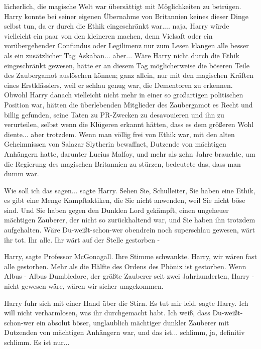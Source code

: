 lächerlich, die magische Welt war übersättigt mit Möglichkeiten zu betrügen.
Harry konnte bei seiner eigenen Übernahme von Britannien keines dieser Dinge
selbst tun, da er durch die Ethik eingeschränkt war.... naja, Harry würde
vielleicht ein paar von den kleineren machen, denn Vielsaft oder ein
vorübergehender Confundus oder Legilimenz nur zum Lesen klangen alle besser als
ein zusätzlicher Tag Askaban... aber... Wäre Harry nicht durch die Ethik
eingeschränkt gewesen, hätte er an diesem Tag möglicherweise die böseren Teile
des Zaubergamot auslöschen können; ganz allein, nur mit den magischen Kräften
eines Erstklässlers, weil er schlau genug war, die Dementoren zu erkennen.
Obwohl Harry danach vielleicht nicht mehr in einer so großartigen politischen
Position war, hätten die überlebenden Mitglieder des Zaubergamot es Recht und
billig gefunden, seine Taten zu PR-Zwecken zu desavouieren und ihn zu
verurteilen, selbst wenn die Klügeren erkannt hätten, dass es dem größeren Wohl
diente... aber trotzdem. Wenn man völlig frei von Ethik war, mit den alten
Geheimnissen von Salazar Slytherin bewaffnet, Dutzende von mächtigen Anhängern
hatte, darunter Lucius Malfoy, und mehr als zehn Jahre brauchte, um die
Regierung des magischen Britannien zu stürzen, bedeutete das, dass man dumm war.

\glqq{}Wie soll ich das sagen...\grqq{} sagte Harry. \glqq{}Sehen Sie,
Schulleiter, Sie haben eine Ethik, es gibt eine Menge Kampftaktiken, die Sie
nicht anwenden, weil Sie nicht böse sind. Und Sie haben gegen den Dunklen Lord
gekämpft, einen ungeheuer mächtigen Zauberer, der nicht so zurückhaltend war,
und Sie haben ihn trotzdem aufgehalten. Wäre Du-weißt-schon-wer obendrein noch
superschlau gewesen, wärt ihr tot. Ihr alle. Ihr wärt auf der Stelle gestorben
-\grqq{}

\glqq{}Harry\grqq{}, sagte Professor McGonagall. Ihre Stimme schwankte. \glqq{}
Harry, wir wären fast alle gestorben. Mehr als die Hälfte des Ordens des Phönix
ist gestorben. Wenn Albus - Albus Dumbledore, der größte Zauberer seit zwei
Jahrhunderten, Harry - nicht gewesen wäre, wären wir sicher umgekommen.\grqq{}

Harry fuhr sich mit einer Hand über die Stirn. \glqq{}Es tut mir leid\grqq{},
sagte Harry. \glqq{}Ich will nicht verharmlosen, was ihr durchgemacht habt. Ich
weiß, dass Du-weißt-schon-wer ein absolut böser, unglaublich mächtiger dunkler
Zauberer mit Dutzenden von mächtigen Anhängern war, und das ist... schlimm, ja,
definitiv schlimm. Es ist nur...\grqq{}

